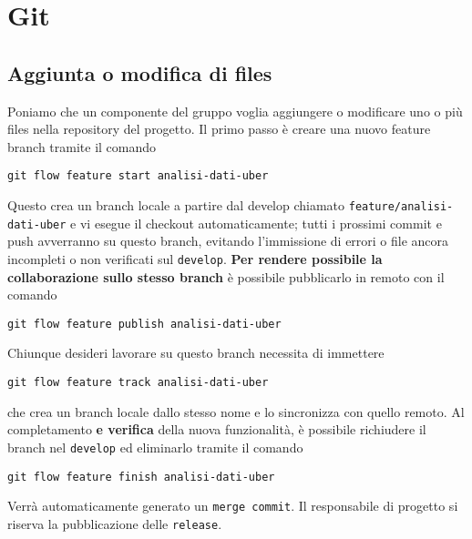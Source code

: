 

\chapter{Git}

\section{Aggiunta o modifica di files}
Poniamo che un componente del gruppo voglia aggiungere o modificare uno o più files nella repository del progetto.
Il primo passo è creare una nuovo feature branch tramite il comando
\begin{lstlisting}
git flow feature start analisi-dati-uber
\end{lstlisting}
Questo crea un branch locale a partire dal develop chiamato \texttt{feature/analisi-dati-uber} e vi esegue il checkout automaticamente; tutti i prossimi commit e push avverranno su questo branch, evitando l'immissione di errori o file ancora incompleti o non verificati sul \texttt{develop}.
\textbf{Per rendere possibile la collaborazione sullo stesso branch} è possibile pubblicarlo in remoto con il comando
\begin{lstlisting}
git flow feature publish analisi-dati-uber
\end{lstlisting}
Chiunque desideri lavorare su questo branch necessita di immettere
\begin{lstlisting}
git flow feature track analisi-dati-uber
\end{lstlisting}
che crea un branch locale dallo stesso nome e lo sincronizza con quello remoto.
Al completamento \textbf{e verifica} della nuova funzionalità, è possibile richiudere il branch nel \texttt{develop} ed eliminarlo tramite il comando
\begin{lstlisting}
git flow feature finish analisi-dati-uber
\end{lstlisting}
Verrà automaticamente generato un \texttt{merge commit}.
Il responsabile di progetto si riserva la pubblicazione delle \texttt{release}.

